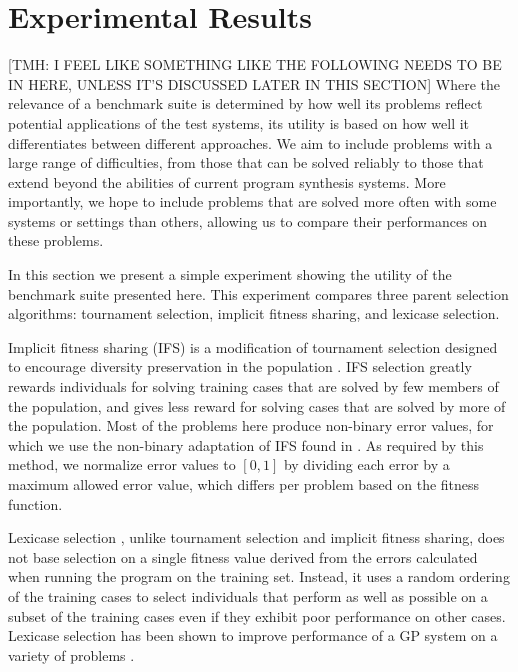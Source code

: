 \documentclass{sig-alternate}
\begin{document}
\section{Experimental Results}

[TMH: I FEEL LIKE SOMETHING LIKE THE FOLLOWING NEEDS TO BE IN HERE, UNLESS IT'S DISCUSSED LATER IN THIS SECTION] Where the relevance of a benchmark suite is determined by how well its problems reflect potential applications of the test systems, its utility is based on how well it differentiates between different approaches. We aim to include problems with a large range of difficulties, from those that can be solved reliably to those that extend beyond the abilities of current program synthesis systems. More importantly, we hope to include problems that are solved more often with some systems or settings than others, allowing us to compare their performances on these problems.

In this section we present a simple experiment showing the utility of the benchmark suite presented here. This experiment compares three parent selection algorithms: tournament selection, implicit fitness sharing, and lexicase selection.

Implicit fitness sharing (IFS) is a modification of tournament selection designed to encourage diversity preservation in the population \cite{McKay:2000:GECCO}. IFS selection greatly rewards individuals for solving training cases that are solved by few members of the population, and gives less reward for solving cases that are solved by more of the population. Most of the problems here produce non-binary error values, for which we use the non-binary adaptation of IFS found in \cite{Krawiec:2013:EvoIASP}. As required by this method, we normalize error values to $[0, 1]$ by dividing each error by a maximum allowed error value, which differs per problem based on the fitness function.

Lexicase selection \cite{Helmuth:2014:ieeeTEC}, %
 unlike tournament selection and implicit fitness sharing, does not base selection on a single fitness value derived from the errors calculated when running the program on the training set. Instead, it uses a random ordering of the training cases to select individuals that perform as well as possible on a subset of the training cases even if they exhibit poor performance on other cases. Lexicase selection has been shown to improve performance of a GP system on a variety of problems \cite{Helmuth:2014:ieeeTEC, Helmuth:2014:GECCO}. %
\end{document}
